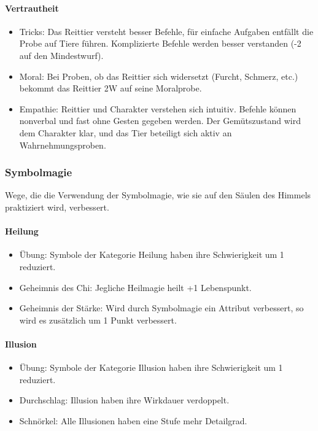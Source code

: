 \documentclass{article}
\begin{document}
\paragraph{Vertrautheit}

\begin{itemize}
\item Tricks: Das Reittier versteht besser Befehle, für einfache Aufgaben entfällt die Probe auf Tiere führen. Komplizierte Befehle werden besser verstanden (-2 auf den Mindestwurf).
\item Moral: Bei Proben, ob das Reittier sich widersetzt (Furcht, Schmerz, etc.) bekommt das Reittier 2W auf seine Moralprobe.
\item Empathie: Reittier und Charakter verstehen sich intuitiv. Befehle können nonverbal und fast ohne Gesten gegeben werden. Der Gemütszustand wird dem Charakter klar, und das Tier beteiligt sich aktiv an Wahrnehmungsproben.
\end{itemize}

\subsubsection{Symbolmagie}

Wege, die die Verwendung der Symbolmagie, wie sie auf den Säulen des Himmels praktiziert wird, verbessert.

\paragraph{Heilung}

\begin{itemize}
\item Übung: Symbole der Kategorie Heilung haben ihre Schwierigkeit um 1 reduziert.
\item Geheimnis des Chi: Jegliche Heilmagie heilt +1 Lebenspunkt.
\item Geheimnis der Stärke: Wird durch Symbolmagie ein Attribut verbessert, so wird es zusätzlich um 1 Punkt verbessert.
\end{itemize}

\paragraph{Illusion}

\begin{itemize}
\item Übung: Symbole der Kategorie Illusion haben ihre Schwierigkeit um 1 reduziert.
\item Durchschlag: Illusion haben ihre Wirkdauer verdoppelt.
\item Schnörkel: Alle Illusionen haben eine Stufe mehr Detailgrad.
\end{itemize}
\end{document}
